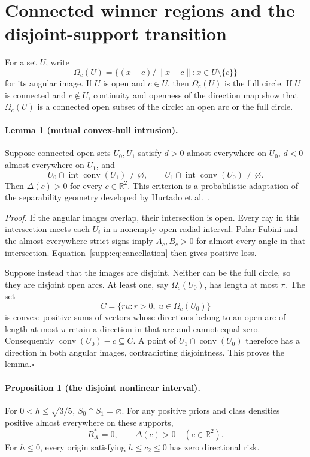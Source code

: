 \section{Connected winner regions and the disjoint-support transition}
\label{supp:geometry}

For a set $U$, write
\[
 \Omega_c(U)=\{(x-c)/\|x-c\|:x\in U\setminus\{c\}\}
\]
for its angular image. If $U$ is open and $c\in U$, then $\Omega_c(U)$ is the full circle. If $U$ is connected and $c\notin U$, continuity and openness of the direction map show that $\Omega_c(U)$ is a connected open subset of the circle: an open arc or the full circle.

\paragraph{Lemma 1 (mutual convex-hull intrusion).}
Suppose connected open sets $U_0,U_1$ satisfy $d>0$ almost everywhere on $U_0$, $d<0$ almost everywhere on $U_1$, and
\begin{equation}
 U_0\cap\operatorname{int}\operatorname{conv}(U_1)\ne\varnothing,
 \qquad
 U_1\cap\operatorname{int}\operatorname{conv}(U_0)\ne\varnothing.
 \label{supp:eq:intrusion}
\end{equation}
Then $\Delta(c)>0$ for every $c\in\mathbb R^2$. This criterion is a probabilistic adaptation of the separability geometry developed by Hurtado et al.\ \citep{Hurtado2001}.

\emph{Proof.}
If the angular images overlap, their intersection is open. Every ray in this intersection meets each $U_i$ in a nonempty open radial interval. Polar Fubini and the almost-everywhere strict signs imply $A_c,B_c>0$ for almost every angle in that intersection. Equation~\eqref{supp:eq:cancellation} then gives positive loss.

Suppose instead that the images are disjoint. Neither can be the full circle, so they are disjoint open arcs. At least one, say $\Omega_c(U_0)$, has length at most $\pi$. The set
\[
 C=\{ru:r>0,\ u\in\Omega_c(U_0)\}
\]
is convex: positive sums of vectors whose directions belong to an open arc of length at most $\pi$ retain a direction in that arc and cannot equal zero. Consequently $\operatorname{conv}(U_0)-c\subseteq C$. A point of $U_1\cap\operatorname{conv}(U_0)$ therefore has a direction in both angular images, contradicting disjointness. This proves the lemma.\hfill$\square$

\paragraph{Proposition 1 (the disjoint nonlinear interval).}
For $0<h\leq\sqrt{3/5}$, $S_0\cap S_1=\varnothing$. For any positive priors and class densities positive almost everywhere on these supports,
\begin{equation}
 R_X^*=0,\qquad\Delta(c)>0\quad(c\in\mathbb R^2).
 \label{supp:eq:disjoint-result}
\end{equation}
For $h\leq0$, every origin satisfying $h\leq c_2\leq0$ has zero directional risk.

